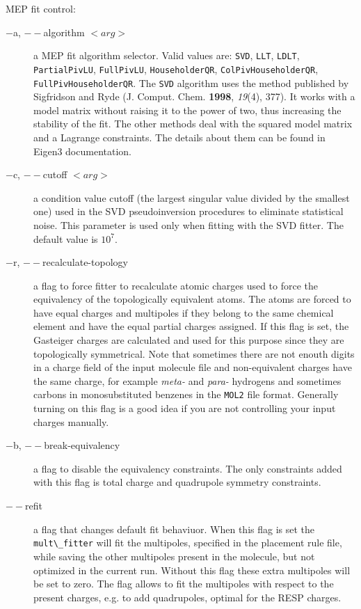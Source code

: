 \documentclass[10pt,a4paper]{article}
\begin{document}
MEP fit control:
\begin{description}
\item[$-$a, $--$algorithm $<arg>$] a MEP fit algorithm selector. Valid values are: 
\lstinline{SVD}, \lstinline{LLT}, \lstinline{LDLT}, \lstinline{PartialPivLU}, 
\lstinline{FullPivLU}, \lstinline{HouseholderQR}, \lstinline{ColPivHouseholderQR},
\lstinline{FullPivHouseholderQR}. 
The \lstinline{SVD} algorithm uses the method published by Sigfridson
and Ryde (J. Comput. Chem. \textbf{1998}, \textit{19}(4), 377). It works with a model
matrix without raising it to the power of two, thus increasing the stability of the fit. 
The other methods deal with the squared model matrix and a Lagrange constraints. The
details about them can be found in Eigen3 documentation.
\item[$-$c, $--$cutoff $<arg>$] a condition value cutoff (the largest singular value divided
by the smallest one) used in the SVD pseudoinversion procedures to eliminate statistical 
noise. This parameter is used only when fitting with the SVD fitter. The default value is 
$10^7$. 
\item[$-$r, $--$recalculate-topology] a flag to force fitter to recalculate atomic
charges used to force the equivalency of the topologically equivalent atoms. The atoms are
forced to have equal charges and multipoles if they belong to the same chemical element
and have the equal partial charges assigned. If this flag is set, the Gasteiger charges are
calculated and used for this purpose since they are topologically symmetrical. Note that
sometimes there are not enouth digits in a charge field of the input molecule file and
non-equivalent charges have the same charge, for example \textit{meta-} and \textit{para-} 
hydrogens and sometimes carbons in monosubstituted benzenes in the \lstinline{MOL2} file 
format. Generally turning on this
flag is a good idea if you are not controlling your input charges manually.
\item[$-$b, $--$break-equivalency] a flag to disable the equivalency constraints. The only
constraints added with this flag is total charge and quadrupole symmetry constraints.
\item[$--$refit] a flag that changes default fit behaviuor. When this flag is set the
\lstinline{mult\_fitter} will fit the multipoles, specified in the placement rule file, 
while saving the other multipoles present in the molecule, but not optimized in the current 
run. Without this flag these extra multipoles will be set to zero. The flag allows to fit 
the multipoles with respect to the present charges, e.g. to add quadrupoles, optimal for 
the RESP charges.
\end{description}
\end{document}
